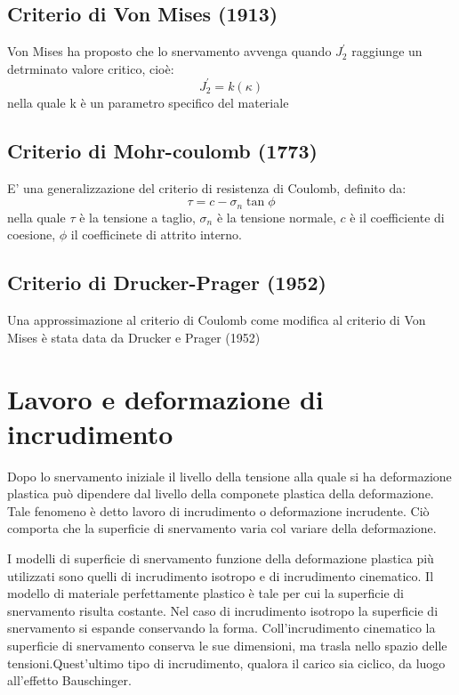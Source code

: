 \subsection{Criterio di Von Mises (1913)}
Von Mises ha proposto che lo snervamento avvenga quando $J_2^{'}$ raggiunge un detrminato valore critico, cioè:
\begin{equation}
	J_2^{'} = k(\kappa)
\end{equation}
nella quale k è un parametro specifico del materiale

\subsection{Criterio di Mohr-coulomb (1773)}
E' una generalizzazione del criterio di resistenza di Coulomb, definito da:
\begin{equation}
	\tau = c - \sigma_n \tan \phi
\end{equation}
nella quale $\tau$ è la tensione a taglio, $\sigma_n$ è la tensione normale, $c$ è il coefficiente di coesione, $\phi$ il coefficinete di attrito interno.

\subsection{Criterio di Drucker-Prager (1952)}
Una approssimazione al criterio di Coulomb come modifica al criterio di Von Mises è stata data da Drucker e Prager (1952)

\section{Lavoro e deformazione di incrudimento}
Dopo lo snervamento iniziale il livello della tensione alla quale si ha deformazione plastica può dipendere dal livello della componete plastica della deformazione. Tale fenomeno è detto lavoro di incrudimento o deformazione incrudente. Ciò comporta che la superficie di snervamento varia col variare della deformazione.

I modelli di superficie di snervamento funzione della deformazione plastica più utilizzati sono quelli di incrudimento isotropo e di incrudimento cinematico. Il modello di materiale  perfettamente plastico è tale per cui la superficie di snervamento risulta costante. Nel caso di incrudimento isotropo la superficie di snervamento si espande conservando la forma. Coll'incrudimento cinematico la superficie di snervamento conserva le sue dimensioni, ma trasla nello spazio delle tensioni.Quest'ultimo tipo di incrudimento, qualora il carico sia ciclico, da luogo all'effetto Bauschinger.

